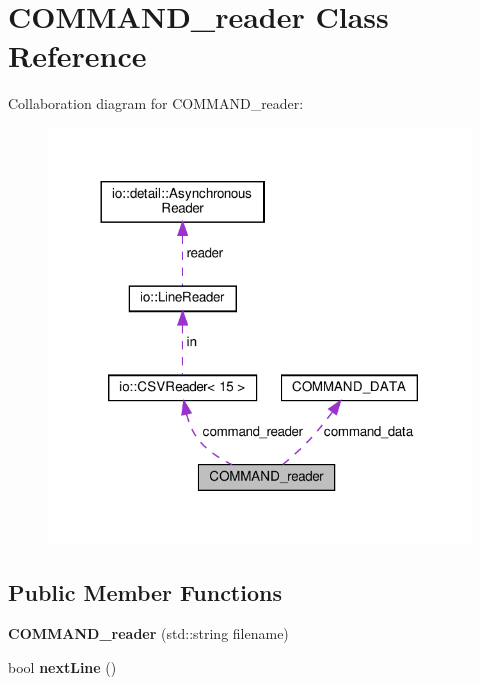 \hypertarget{classCOMMAND__reader}{}\section{C\+O\+M\+M\+A\+N\+D\+\_\+reader Class Reference}
\label{classCOMMAND__reader}


Collaboration diagram for C\+O\+M\+M\+A\+N\+D\+\_\+reader\+:\nopagebreak
\begin{figure}[H]
\begin{center}
\leavevmode
\includegraphics[width=317pt]{classCOMMAND__reader__coll__graph}
\end{center}
\end{figure}
\subsection*{Public Member Functions}
\begin{DoxyCompactItemize}
\item 
\mbox{\label{classCOMMAND__reader_ac0f5853e4caf6757c308cbddf0f7af25}} 
{\bfseries C\+O\+M\+M\+A\+N\+D\+\_\+reader} (std\+::string filename)
\item 
\mbox{\label{classCOMMAND__reader_ad2d61ec5a5af57c09cb3bcefbb3c4629}} 
bool {\bfseries next\+Line} ()
\end{DoxyCompactItemize}
